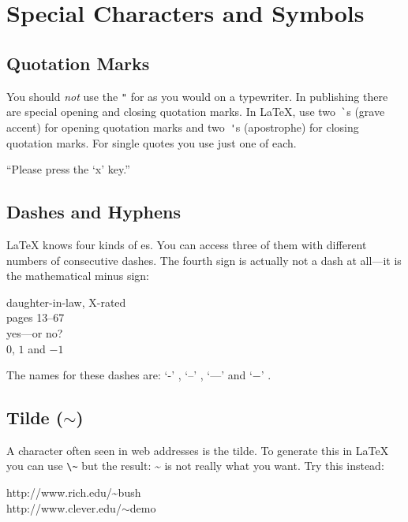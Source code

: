 \section{Special Characters and Symbols}
 
\subsection{Quotation Marks}

You should \emph{not} use the \verb|"| for 
 as you would on a typewriter.  In publishing
there are special opening and closing quotation marks.  In \LaTeX{},
use two~\verb|`|s (grave accent) for opening quotation marks and
two~\verb|'|s (apostrophe) for closing quotation marks. For single
quotes you use just one of each.
\begin{example}
``Please press the `x' key.''
\end{example}
 
\subsection{Dashes and Hyphens}

\LaTeX{} knows four kinds of es. You can access three of
them with different numbers of consecutive dashes. The fourth sign
is actually not a dash at all---it is the mathematical minus sign: \index{-}
\index{--} \index{---}  

\begin{example}
daughter-in-law, X-rated\\
pages 13--67\\
yes---or no? \\
$0$, $1$ and $-1$
\end{example}
The names for these dashes are: 
`-' , `--' , `---'  and
`$-$' .

\subsection{Tilde (\texorpdfstring{$\sim$}{~})}
A character often seen in web addresses is the tilde. To generate
this in \LaTeX{} you can use \verb|\~| but the result: \~{} is not really
what you want. Try this instead:

\begin{example}
http://www.rich.edu/\~{}bush \\
http://www.clever.edu/$\sim$demo
\end{example}  
 
